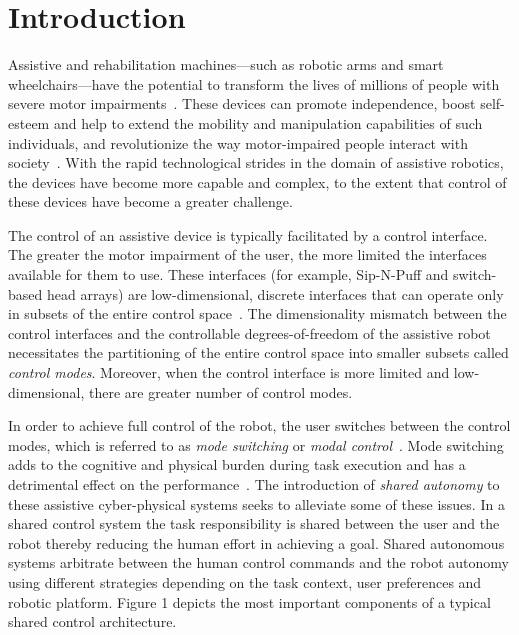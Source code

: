 \section{Introduction}\label{sec:intro}

Assistive and rehabilitation machines---such as robotic arms and smart wheelchairs---have the potential to transform the lives of millions of people with severe motor impairments~\cite{laplante1992assistive}. These devices can promote independence, boost self-esteem and help to extend the mobility and manipulation capabilities of such individuals, and revolutionize the way motor-impaired people interact with society~\cite{scherer1996outcomes, huete2012personal}. With the rapid technological strides in the domain of assistive robotics, the devices have become more capable and complex, to the extent that control of these devices have become a greater challenge. 

The control of an assistive device is typically facilitated by a control interface. The greater the motor impairment of the user, the more limited the interfaces available for them to use. These interfaces (for example, Sip-N-Puff and switch-based head arrays) are low-dimensional, discrete interfaces that can operate only in subsets of the entire control space~\cite{simpson2008tooth, nuttin2002selection}. 
The dimensionality mismatch between the control interfaces and the controllable degrees-of-freedom of the assistive robot necessitates the partitioning of the entire control space into smaller subsets called \textit{control modes}. Moreover, when the control interface is more limited and low-dimensional, there are greater number of control modes. 

In order to achieve full control of the robot, the user switches between the control modes, which is referred to as \textit{mode switching} or \textit{modal control}~\cite{herlant2016assistive}. Mode switching adds to the cognitive and physical burden during task execution and has a detrimental effect on the performance~\cite{eftring1999technical}. The introduction of \textit{shared autonomy} to these assistive cyber-physical systems seeks to alleviate some of these issues. In a shared control system the task responsibility is shared between the user and the robot thereby reducing the human effort in achieving a goal. Shared autonomous systems arbitrate between the human control commands and the robot autonomy using different strategies depending on the task context, user preferences and robotic platform. Figure 1 depicts the most important components of a  typical shared control architecture.

